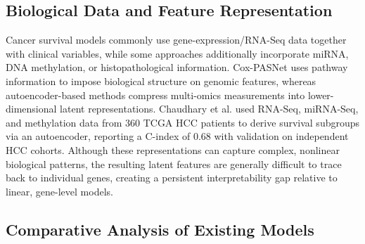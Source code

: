 \documentclass[10pt,a4paper]{article}
\begin{document}
\subsection{Biological Data and Feature Representation}

Cancer survival models commonly use gene-expression/RNA-Seq data together with clinical variables, while some approaches additionally incorporate miRNA, DNA methylation, or histopathological information. Cox-PASNet uses pathway information to impose biological structure on genomic features, whereas autoencoder-based methods compress multi-omics measurements into lower-dimensional latent representations. Chaudhary et al. \cite{chaudhary2018deep} used RNA-Seq, miRNA-Seq, and methylation data from 360 TCGA HCC patients to derive survival subgroups via an autoencoder, reporting a C-index of 0.68 with validation on independent HCC cohorts. Although these representations can capture complex, nonlinear biological patterns, the resulting latent features are generally difficult to trace back to individual genes, creating a persistent interpretability gap relative to linear, gene-level models.

\subsection{Comparative Analysis of Existing Models}
\end{document}
